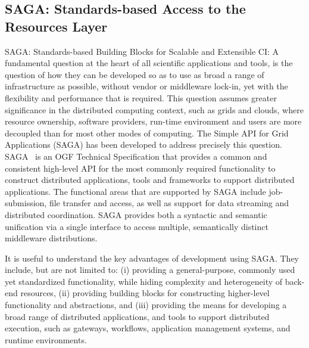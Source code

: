 \documentclass[]{svjour3}
\begin{document}
\subsection{SAGA: Standards-based Access to the Resources Layer}



SAGA: Standards-based Building Blocks for Scalable and Extensible CI:
A fundamental question at the heart of all scientific applications and
tools, is the question of how they can be developed so as to use as
broad a range of infrastructure as possible, without vendor or
middleware lock-in, yet with the flexibility and performance that is
required. This question assumes greater significance in the distributed
computing context, such as grids and clouds, where resource ownership,
software providers, run-time environment and users are more decoupled
than for most other modes of computing. The Simple API for Grid
Applications (SAGA) has been developed to address precisely this
question. SAGA~\cite{saga_url} is an OGF Technical Specification that
provides a common and consistent high-level API for the most commonly
required functionality to construct distributed applications, tools
and frameworks to support distributed applications. The functional
areas that are supported by SAGA include job-submission, file transfer
and access, as well as support for data streaming and distributed
coordination. SAGA provides both a syntactic and semantic unification
via a single interface to access multiple, semantically distinct
middleware distributions.

It is useful to understand the key advantages of development using
SAGA. They include, but are not limited to: (i) providing a
general-purpose, commonly used yet standardized functionality, while
hiding complexity and heterogeneity of back-end resources, (ii)
providing building blocks for constructing higher-level functionality
and abstractions, and (iii) providing the means for developing a broad
range of distributed applications, and tools to support distributed
execution, such as gateways, workflows, application management
systems, and runtime environments.
\end{document}
